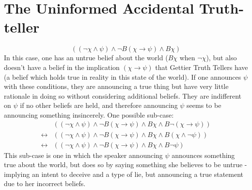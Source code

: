 \documentclass[12pt, titlepage, twoside, a4paper]{report}
\begin{document}
\section{The Uninformed Accidental Truth-teller}
$$((\neg \chi \wedge \psi) \wedge \neg B(\chi \to \psi) \wedge B \chi)$$
In this case, one has an untrue belief about the world ($B\chi$ when $\neg \chi$), but also doesn't have a belief in the implication $(\chi \to \psi)$ that Gettier Truth Tellers have (a belief which holds true in reality in this state of the world). If one announces $\psi$ with these conditions, they are announcing a true thing but have very little rationale in doing so without considering additional beliefs. They are indifferent on $\psi$ if no other beliefs are held, and therefore announcing $\psi$ seems to be announcing something insincerely. One possible sub-case:
\begin{align*}
&((\neg \chi \wedge \psi) \wedge \neg B(\chi \to \psi) \wedge B \chi \wedge B \neg (\chi \to \psi ))\\
\leftrightarrow &((\neg \chi \wedge \psi) \wedge \neg B(\chi \to \psi) \wedge B \chi \wedge B (\chi \wedge \neg \psi ))\\
\leftrightarrow &((\neg \chi \wedge \psi) \wedge \neg B(\chi \to \psi) \wedge B \chi \wedge B \neg \psi)
\end{align*}
This sub-case is one in which the speaker announcing $\psi$ announces something true about the world, but does so by saying something she believes to be untrue - implying an intent to deceive and a type of lie, but announcing a true statement due to her incorrect beliefs. 
\end{document}
